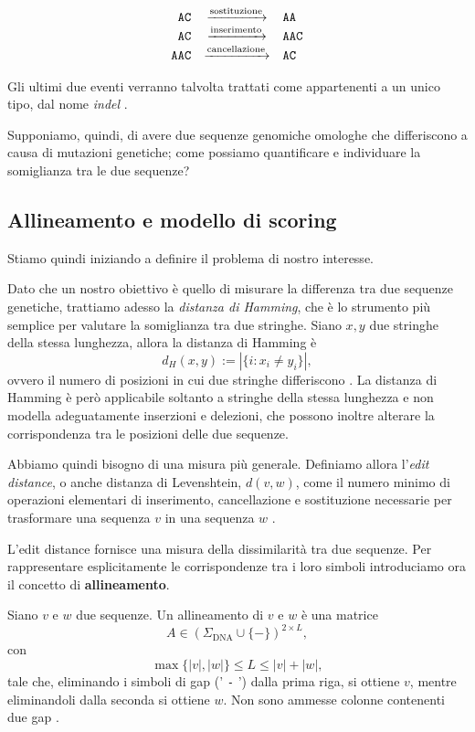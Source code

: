 \[
\begin{array}{r c l}
    \texttt{AC}  & \xrightarrow{\text{sostituzione}} & \texttt{AA} \\
    \texttt{AC}  & \xrightarrow{\text{inserimento}}   & \texttt{AAC} \\ 
    \texttt{AAC} & \xrightarrow{\text{cancellazione}}    & \texttt{AC}
\end{array}
\]

Gli ultimi due eventi verranno talvolta trattati come appartenenti a un unico tipo, dal nome \emph{indel} \cite[pp.~167--172]{jones--pevzner}.

Supponiamo, quindi, di avere due sequenze genomiche omologhe che differiscono a causa di mutazioni genetiche; come possiamo quantificare e
individuare la somiglianza tra le due sequenze?

\subsection{Allineamento e modello di scoring}

Stiamo quindi iniziando a definire il problema di nostro interesse.

Dato che un nostro obiettivo è quello di misurare la differenza tra due sequenze genetiche, trattiamo adesso la \emph{distanza di Hamming}, che è lo strumento più semplice per valutare la somiglianza tra due stringhe.
Siano $x,y$ due stringhe della stessa lunghezza, allora la distanza di Hamming è
\[
    d_H(x,y) := |\{i:x_i\neq y_i\}|,
\]
ovvero il numero di posizioni in cui due stringhe differiscono \cite{jones--pevzner}.
La distanza di Hamming è però applicabile soltanto a stringhe della stessa lunghezza e non modella adeguatamente inserzioni e delezioni, che possono
inoltre alterare la corrispondenza tra le posizioni delle due sequenze.

Abbiamo quindi bisogno di una misura più generale.
Definiamo allora l'\emph{edit distance}, o anche distanza di Levenshtein, $d(v,w)$, come il numero minimo di operazioni elementari
di inserimento, cancellazione e sostituzione necessarie per trasformare una sequenza $v$ in una sequenza $w$ \cite[pp.~167--172]{jones--pevzner}.

L'edit distance fornisce una misura della dissimilarità tra due sequenze. Per rappresentare esplicitamente le corrispondenze tra i loro simboli
introduciamo ora il concetto di \textbf{allineamento}.

Siano $v$ e $w$ due sequenze. Un allineamento di $v$ e $w$ è una matrice 
\[
    A\in(\Sigma_{\text{DNA}}\cup \{ - \})^{2\times L},
\]
con
\[
    \max \{ |v|,|w| \}\leq L \leq |v| + |w|,
\]
tale che, eliminando i simboli di gap (' \texttt{-} ') dalla prima riga, si ottiene $v$, mentre eliminandoli dalla seconda si ottiene $w$.
Non sono ammesse colonne contenenti due gap \cite[pp.~226--228]{compeau--pevzner}.

